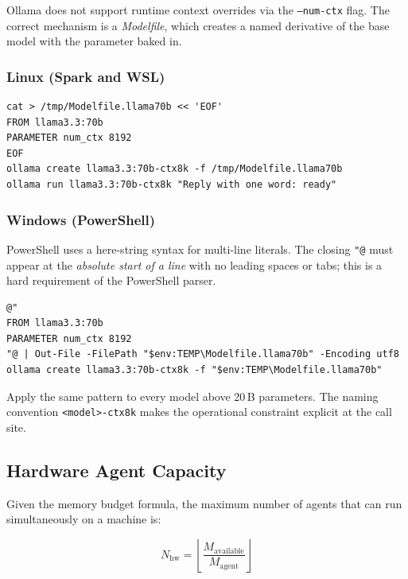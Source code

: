 Ollama does not support runtime context overrides via the
\texttt{--num-ctx} flag. The correct mechanism is a \emph{Modelfile},
which creates a named derivative of the base model with the parameter
baked in.

\subsubsection{Linux (Spark and WSL)}

\begin{lstlisting}[style=bashstyle, caption={Create a context-bounded model variant on Linux}]
cat > /tmp/Modelfile.llama70b << 'EOF'
FROM llama3.3:70b
PARAMETER num_ctx 8192
EOF
ollama create llama3.3:70b-ctx8k -f /tmp/Modelfile.llama70b
ollama run llama3.3:70b-ctx8k "Reply with one word: ready"
\end{lstlisting}

\subsubsection{Windows (PowerShell)}

PowerShell uses a here-string syntax for multi-line literals. The
closing \texttt{"@} must appear at the \emph{absolute start of a line}
with no leading spaces or tabs; this is a hard requirement of the
PowerShell parser.

\begin{lstlisting}[style=psstyle, caption={Create a context-bounded model variant on Windows}]
@"
FROM llama3.3:70b
PARAMETER num_ctx 8192
"@ | Out-File -FilePath "$env:TEMP\Modelfile.llama70b" -Encoding utf8
ollama create llama3.3:70b-ctx8k -f "$env:TEMP\Modelfile.llama70b"
\end{lstlisting}

Apply the same pattern to every model above 20\,B parameters. The
naming convention \texttt{<model>-ctx8k} makes the operational
constraint explicit at the call site.

\subsection{Hardware Agent Capacity}

Given the memory budget formula, the maximum number of agents that can
run simultaneously on a machine is:

\begin{equation}
N_{\text{hw}} = \left\lfloor \frac{M_{\text{available}}}{M_{\text{agent}}} \right\rfloor
\label{eq:nhw}
\end{equation}

